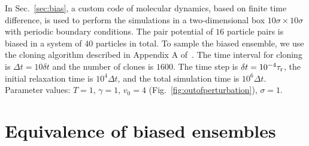\documentclass[superscriptaddress, twocolumn, prx, longbibliography, nofootinbib]{revtex4-1}
\begin{document}
In Sec.~\ref{sec:bias}, a custom code of molecular dynamics, based on finite time difference, is used to perform the simulations in a two-dimensional box $10\sigma\times 10\sigma$ with periodic boundary conditions. The pair potential of $16$ particle pairs is biased in a system of $40$ particles in total. To sample the biased ensemble, we use the cloning algorithm described in Appendix A of~\cite{Nemoto2016}. The time interval for cloning is $\Delta t = 10 \delta t$ and the number of clones is $1600$. The time step is $\delta t = 10^{-4} \tau_{\rm r}$, the initial relaxation time is $10^4\Delta t$, and the total simulation time is $10^6 \Delta t$. Parameter values: $T=1$, $\gamma=1$, $v_0=4$ (Fig.~\ref{fig:outofperturbation}), $\sigma=1$.




\section{Equivalence of biased ensembles}\label{app:far}
\end{document}
